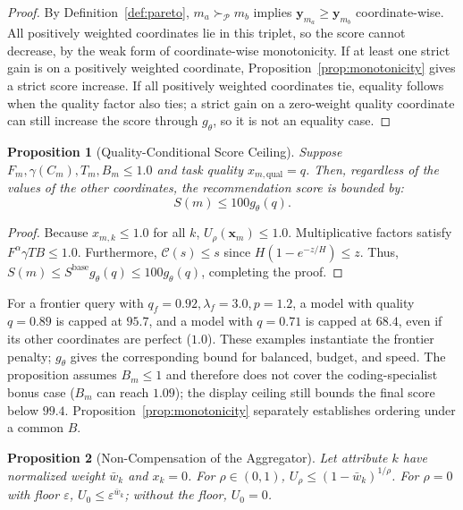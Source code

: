 \documentclass[pdflatex,sn-mathphys-num]{sn-jnl}
\theoremstyle{thmstyleone}
\newtheorem{proposition}{Proposition}
\theoremstyle{thmstylethree}
\begin{document}
\begin{proof}
By Definition~\ref{def:pareto}, $m_a \succ_{\mathcal{P}} m_b$ implies $\mathbf{y}_{m_a} \ge \mathbf{y}_{m_b}$ coordinate-wise. All positively weighted coordinates lie in this triplet, so the score cannot decrease, by the weak form of coordinate-wise monotonicity. If at least one strict gain is on a positively weighted coordinate, Proposition~\ref{prop:monotonicity} gives a strict score increase. If all positively weighted coordinates tie, equality follows when the quality factor also ties; a strict gain on a zero-weight quality coordinate can still increase the score through $g_\theta$, so it is not an equality case.
\end{proof}

\begin{proposition}[Quality-Conditional Score Ceiling]\label{prop:ceiling}
Suppose $F_m, \gamma(C_m), T_m, B_m \le 1.0$ and task quality $x_{m, \text{qual}} = q$. Then, regardless of the values of the other coordinates, the recommendation score is bounded by:
\begin{equation}\label{eq:ceiling_proof}
S(m) \le 100 g_\theta(q).
\end{equation}
\end{proposition}

\begin{proof}
Because $x_{m, k} \le 1.0$ for all $k$, $U_\rho(\mathbf{x}_m) \le 1.0$. Multiplicative factors satisfy $F^\alpha \gamma T B \le 1.0$. Furthermore, $\mathcal{C}(s) \le s$ since $H(1 - e^{-z/H}) \le z$. Thus, $S(m) \le S^{\text{base}} g_\theta(q) \le 100 g_\theta(q)$, completing the proof.
\end{proof}

For a frontier query with $q_f = 0.92, \lambda_f = 3.0, p = 1.2$, a model with quality $q = 0.89$ is capped at $95.7$, and a model with $q = 0.71$ is capped at $68.4$, even if its other coordinates are perfect ($1.0$). These examples instantiate the frontier penalty; $g_\theta$ gives the corresponding bound for balanced, budget, and speed. The proposition assumes $B_m\le1$ and therefore does not cover the coding-specialist bonus case ($B_m$ can reach $1.09$); the display ceiling still bounds the final score below $99.4$. Proposition~\ref{prop:monotonicity} separately establishes ordering under a common $B$.

\begin{proposition}[Non-Compensation of the Aggregator]\label{prop:agg_noncomp}
Let attribute $k$ have normalized weight $\bar{w}_k$ and $x_k = 0$. For $\rho \in (0, 1)$, $U_\rho \le (1 - \bar{w}_k)^{1/\rho}$. For $\rho = 0$ with floor $\varepsilon$, $U_0 \le \varepsilon^{\bar{w}_k}$; without the floor, $U_0 = 0$.
\end{proposition}
\end{document}
